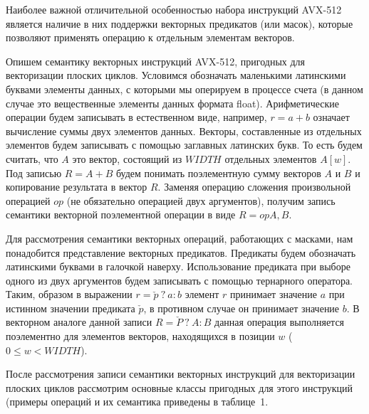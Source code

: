 \documentclass[
11pt,%
tightenlines,%
twoside,%
onecolumn,%
nofloats,%
nobibnotes,%
nofootinbib,%
superscriptaddress,%
noshowpacs,%
centertags]%
{revtex4}
\begin{document}
Наиболее важной отличительной особенностью набора инструкций AVX-512 является наличие в них поддержки векторных предикатов (или масок), которые позволяют применять операцию к отдельным элементам векторов.

Опишем семантику векторных инструкций AVX-512, пригодных для векторизации плоских циклов.
Условимся обозначать маленькими латинскими буквами элементы данных, с которыми мы оперируем в процессе счета (в данном случае это вещественные элементы данных формата float).
Арифметические операции будем записывать в естественном виде, например, $r = a + b$ означает вычисление суммы двух элементов данных.
Векторы, составленные из отдельных элементов будем записывать с помощью заглавных латинских букв.
То есть будем считать, что $A$ это вектор, состоящий из $WIDTH$ отдельных элементов $A[w]$.
Под записью $R = A + B$ будем понимать поэлементную сумму векторов $A$ и $B$ и копирование результата в вектор $R$.
Заменяя операцию сложения произвольной операцией $op$ (не обязательно операцией двух аргументов), получим запись семантики векторной поэлементной операции в виде $R = op A, B$.

Для рассмотрения семантики векторных операций, работающих с масками, нам понадобится представление векторных предикатов.
Предикаты будем обозначать латинскими буквами в галочкой наверху.
Использование предиката при выборе одного из двух аргументов будем записывать с помощью тернарного оператора.
Таким, образом в выражении $r = \check{p} \ ? \ a : b$ элемент $r$ принимает значение $a$ при истинном значении предиката $\check{p}$, в противном случае он принимает значение $b$.
В векторном аналоге данной записи $R = \check{P} \ ? \ A : B$ данная операция выполняется поэлементно для элементов векторов, находящихся в позиции $w$ ($0 \le w < WIDTH$).

После рассмотрения записи семантики векторных инструкций для векторизации плоских циклов рассмотрим основные классы пригодных для этого инструкций (примеры операций и их семантика приведены в таблице~1.
\end{document}
